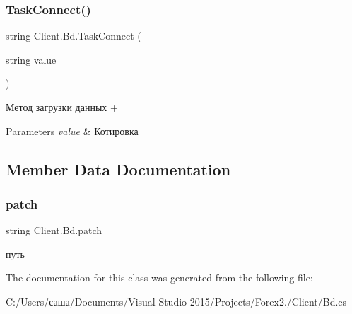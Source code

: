 \subsubsection{\texorpdfstring{Task\+Connect()}{TaskConnect()}}
{\footnotesize\ttfamily string Client.\+Bd.\+Task\+Connect (\begin{DoxyParamCaption}\item[{string}]{value }\end{DoxyParamCaption})\hspace{0.3cm}{\ttfamily [inline]}}



Метод загрузки данных + 


\begin{DoxyParams}{Parameters}
{\em value} & Котировка\\
\hline
\end{DoxyParams}


\subsection{Member Data Documentation}
\hypertarget{class_client_1_1_bd_a4fff732ae82883ee9238243620430c41}{}\label{class_client_1_1_bd_a4fff732ae82883ee9238243620430c41} 
\subsubsection{\texorpdfstring{patch}{patch}}
{\footnotesize\ttfamily string Client.\+Bd.\+patch\hspace{0.3cm}{\ttfamily [protected]}}



путь 



The documentation for this class was generated from the following file\+:\begin{DoxyCompactItemize}
\item 
C\+:/\+Users/саша/\+Documents/\+Visual Studio 2015/\+Projects/\+Forex2./\+Client/Bd.\+cs\end{DoxyCompactItemize}
